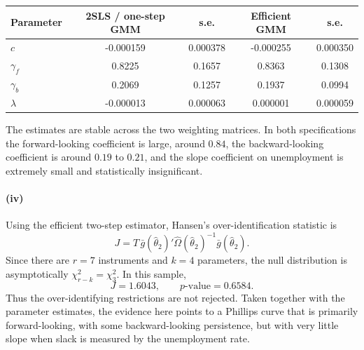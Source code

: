 \documentclass[11pt]{article}
\newcommand{\QSixCOne}{-0.000159}
\newcommand{\QSixGFOne}{0.8225}
\newcommand{\QSixGBOne}{0.2069}
\newcommand{\QSixLamOne}{-0.000013}
\newcommand{\QSixCOneSE}{0.000378}
\newcommand{\QSixGFOneSE}{0.1657}
\newcommand{\QSixGBOneSE}{0.1257}
\newcommand{\QSixLamOneSE}{0.000063}
\newcommand{\QSixCTwo}{-0.000255}
\newcommand{\QSixGFTwo}{0.8363}
\newcommand{\QSixGBTwo}{0.1937}
\newcommand{\QSixLamTwo}{0.000001}
\newcommand{\QSixCTwoSE}{0.000350}
\newcommand{\QSixGFTwoSE}{0.1308}
\newcommand{\QSixGBTwoSE}{0.0994}
\newcommand{\QSixLamTwoSE}{0.000059}
\newcommand{\QSixJStat}{1.6043}
\newcommand{\QSixJPValue}{0.6584}
\begin{document}
\begin{center}
\begin{tabular}{lcccc}
\toprule
Parameter & 2SLS / one-step GMM & s.e. & Efficient GMM & s.e. \\
\midrule
\(c\) & \QSixCOne & \QSixCOneSE & \QSixCTwo & \QSixCTwoSE \\
\(\gamma_f\) & \QSixGFOne & \QSixGFOneSE & \QSixGFTwo & \QSixGFTwoSE \\
\(\gamma_b\) & \QSixGBOne & \QSixGBOneSE & \QSixGBTwo & \QSixGBTwoSE \\
\(\lambda\) & \QSixLamOne & \QSixLamOneSE & \QSixLamTwo & \QSixLamTwoSE \\
\bottomrule
\end{tabular}
\end{center}

The estimates are stable across the two weighting matrices. In both specifications the forward-looking coefficient is large, around \(0.84\), the backward-looking coefficient is around \(0.19\) to \(0.21\), and the slope coefficient on unemployment is extremely small and statistically insignificant.

\paragraph{(iv)}
Using the efficient two-step estimator, Hansen's over-identification statistic is
\[
J
=
T\,\bar g(\widehat\theta_2)'\widehat\Omega(\widehat\theta_2)^{-1}\bar g(\widehat\theta_2).
\]
Since there are \(r=7\) instruments and \(k=4\) parameters, the null distribution is asymptotically \(\chi^2_{r-k}=\chi^2_3\). In this sample,
\[
J=\QSixJStat,
\qquad
p\text{-value}=\QSixJPValue.
\]
Thus the over-identifying restrictions are not rejected. Taken together with the parameter estimates, the evidence here points to a Phillips curve that is primarily forward-looking, with some backward-looking persistence, but with very little slope when slack is measured by the unemployment rate.
\end{document}
